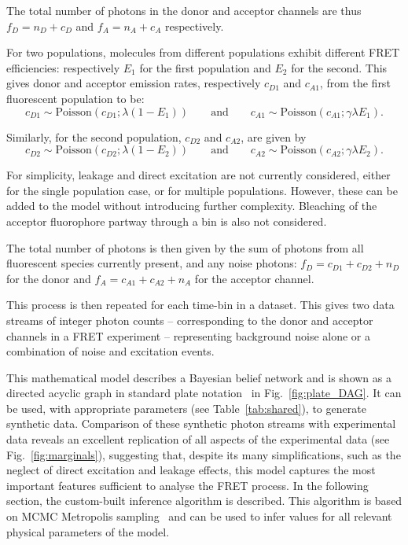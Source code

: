 The total number of photons in the donor and acceptor channels are thus $f_D = n_D + c_D$ and $f_A = n_A + c_A$ respectively.   

For two populations, molecules from different populations exhibit different FRET efficiencies: respectively $E_1$ for the first population and $E_2$ for the second. This gives donor and acceptor emission rates, respectively $c_{D1}$ and $c_{A1}$, from the first fluorescent population to be:
\begin{equation}
 c_{D1} \sim \text{Poisson}(c_{D1}; \lambda(1-E_1)) \qquad \text{and} \qquad c_{A1} \sim \text{Poisson}(c_{A1}; \gamma \lambda E_1). 
\end{equation}

Similarly, for the second population, $c_{D2}$ and $c_{A2}$, are given by
\begin{equation}
 c_{D2} \sim \text{Poisson}(c_{D2}; \lambda(1-E_2)) \qquad \text{and} \qquad c_{A2} \sim \text{Poisson}(c_{A2}; \gamma \lambda E_2). 
\end{equation}

For simplicity, leakage and direct excitation are not currently considered, either for the single population case, or for multiple populations. However, these can be added to the model without introducing further complexity. Bleaching of the acceptor fluorophore partway through a bin is also not considered. 

The total number of photons is then given by the sum of photons from all fluorescent species currently present, and any noise photons: $f_D = c_{D1}+c_{D2}+n_D$ for the donor and $f_A = c_{A1}+c_{A2} +n_A$ for the acceptor channel.     

This process is then repeated for each time-bin in a dataset. This gives two data streams of integer photon counts -- corresponding to the donor and acceptor channels in a FRET experiment -- representing background noise alone or a combination of noise and excitation events.

This mathematical model describes a Bayesian belief network and is shown as a directed acyclic graph in standard plate notation~\cite{Buntine1994} in Fig.~\ref{fig:plate_DAG}. It can be used, with appropriate parameters (see Table~\ref{tab:shared}), to generate synthetic data. Comparison of these synthetic photon streams with experimental data reveals an excellent replication of all aspects of the experimental data (see Fig.~\ref{fig:marginals}), suggesting that, despite its many simplifications, such as the neglect of direct excitation and leakage effects, this model captures the most important features sufficient to analyse the FRET process. In the following section, the custom-built inference algorithm is described. This algorithm is based on MCMC Metropolis sampling~\cite{hastings70} and can be used to infer values for all relevant physical parameters of the model.

